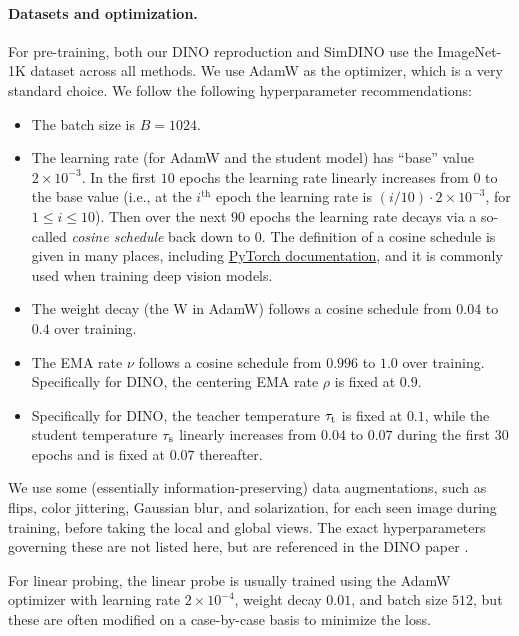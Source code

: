 \documentclass[\toplevelprefix/book-main.tex]{subfiles}
\begin{document}
\paragraph{Datasets and optimization.} For pre-training, both our DINO reproduction and SimDINO use the ImageNet-1K dataset across all methods. We use AdamW \citep{Loshchilov2017DecoupledWD} as the optimizer, which is a very standard choice. We follow the following hyperparameter recommendations:
\begin{itemize}
    \item The batch size is \(B = 1024\).
    \item The learning rate (for AdamW and the student model) has ``base'' value \(2 \times 10^{-3}\). In the first \(10\) epochs the learning rate linearly increases from \(0\) to the base value (i.e., at the \(i^{\mathrm{th}}\) epoch the learning rate is \((i/10) \cdot 2 \times 10^{-3}\), for \(1 \leq i \leq 10\)). Then over the next \(90\) epochs the learning rate decays via a so-called \textit{cosine schedule} back down to \(0\). The definition of a cosine schedule is given in many places, including \href{https://pytorch.org/docs/stable/generated/torch.optim.lr_scheduler.CosineAnnealingLR.html}{PyTorch documentation}, and it is commonly used when training deep vision models.
    \item The weight decay (the W in AdamW) follows a cosine schedule from 0.04 to \(0.4\) over training.
    \item The EMA rate \(\nu\) follows a cosine schedule from \(0.996\) to \(1.0\) over training. Specifically for DINO, the centering EMA rate \(\rho\) is fixed at \(0.9\).
    \item Specifically for DINO, the teacher temperature \(\tau_{\mathrm{t}}\) is fixed at \(0.1\), while the student temperature \(\tau_{\mathrm{s}}\) linearly increases from \(0.04\) to \(0.07\) during the first \(30\) epochs and is fixed at \(0.07\) thereafter.
\end{itemize}
We use some (essentially information-preserving) data augmentations, such as flips, color jittering, Gaussian blur, and solarization, for each seen image during training, before taking the local and global views. The exact hyperparameters governing these are not listed here, but are referenced in the DINO paper \citep{caron2021emerging}.

For linear probing, the linear probe is usually trained using the AdamW optimizer with learning rate \(2 \times 10^{-4}\), weight decay \(0.01\), and batch size \(512\), but these are often modified on a case-by-case basis to minimize the loss.
\end{document}
